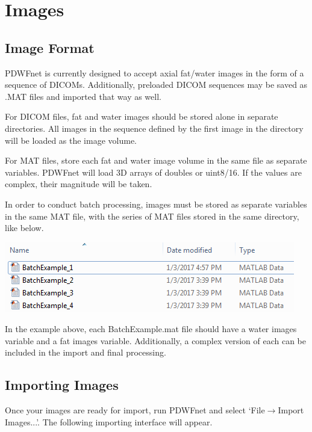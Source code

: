 \documentclass[twoside,a4paper]{refart}
\begin{document}

\section{Images}

\subsection{Image Format}

PDWFnet is currently designed to accept axial fat/water images in the form of a sequence of DICOMs. Additionally, preloaded DICOM sequences may be saved as .MAT files and imported that way as well.

For DICOM files, fat and water images should be stored alone in separate directories. All images in the sequence defined by the first image in the directory will be loaded as the image volume.

For MAT files, store each fat and water image volume in the same file as separate variables. PDWFnet will load 3D arrays of doubles or uint8/16. If the values are complex, their magnitude will be taken.

In order to conduct batch processing, images must be stored as separate variables in the same MAT file, with the series of MAT files stored in the same directory, like below.

\includegraphics[width=.7\textwidth]{BatchMAT_cap.png}

In the example above, each BatchExample.mat file should have a water images variable and a fat images variable. Additionally, a complex version of each can be included in the import and final processing.

\subsection{Importing Images}

Once your images are ready for import, run PDWFnet and select `File$\rightarrow$Import Images...'. The following importing interface will appear.
\end{document}
